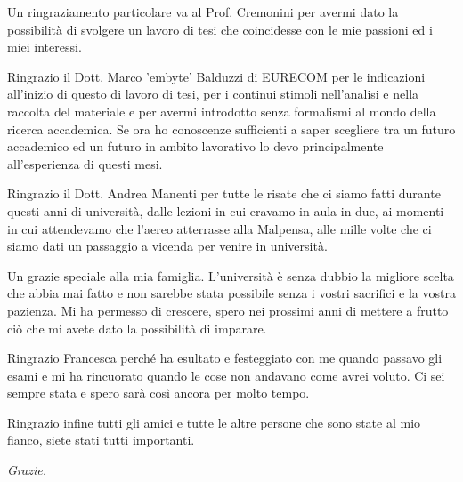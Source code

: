 Un ringraziamento particolare va al Prof. Cremonini per avermi dato la possibilità di svolgere un lavoro di tesi che coincidesse con le mie passioni ed i miei interessi.

Ringrazio il Dott. Marco 'embyte' Balduzzi di EURECOM per le indicazioni all'inizio di questo di lavoro di tesi, per i continui stimoli nell'analisi e nella raccolta del materiale e per avermi introdotto senza formalismi al mondo della ricerca accademica. Se ora ho conoscenze sufficienti a saper scegliere tra un futuro accademico ed un futuro in ambito lavorativo lo devo principalmente all'esperienza di questi mesi.

Ringrazio il Dott. Andrea Manenti per tutte le risate che ci siamo fatti durante questi anni di università, dalle lezioni in cui eravamo in aula in due, ai momenti in cui attendevamo che l'aereo atterrasse alla Malpensa, alle mille volte che ci siamo dati un passaggio a vicenda per venire in università.

Un grazie speciale alla mia famiglia. L'università è senza dubbio la migliore scelta che abbia mai fatto e non sarebbe stata possibile senza i vostri sacrifici e la vostra pazienza. Mi ha permesso di crescere, spero nei prossimi anni di mettere a frutto ciò che mi avete dato la possibilità di imparare.

Ringrazio Francesca perché ha esultato e festeggiato con me quando passavo gli esami e mi ha rincuorato quando le cose non andavano come avrei voluto. Ci sei sempre stata e spero sarà così ancora per molto tempo.

Ringrazio infine tutti gli amici e tutte le altre persone che sono state al mio fianco, siete stati tutti importanti.

\emph{Grazie.}